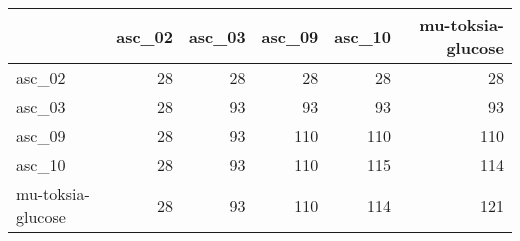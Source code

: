 \begin{tabular}{lrrrrr}
\toprule
 & asc_02 & asc_03 & asc_09 & asc_10 & mu-toksia-glucose \\
\midrule
asc_02 & 28 & 28 & 28 & 28 & 28 \\
asc_03 & 28 & 93 & 93 & 93 & 93 \\
asc_09 & 28 & 93 & 110 & 110 & 110 \\
asc_10 & 28 & 93 & 110 & 115 & 114 \\
mu-toksia-glucose & 28 & 93 & 110 & 114 & 121 \\
\bottomrule
\end{tabular}
